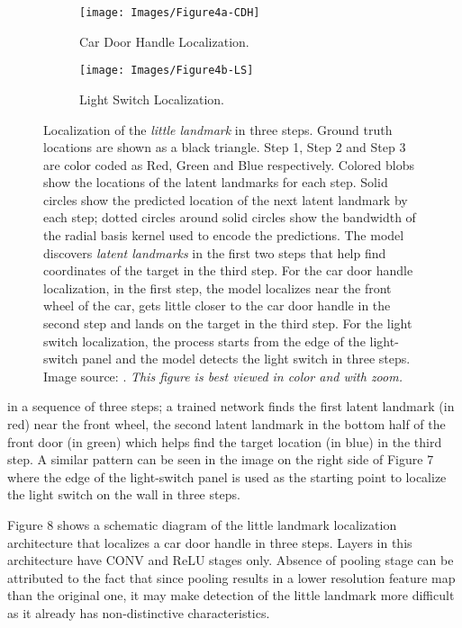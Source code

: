 \documentclass [11pt,letterpaper ,openany ]{report}
\begin{document}
    \begin{figure}[h!]
    \centering
        \begin{subfigure}[b]{0.45\linewidth}
            \texttt{[image: Images/Figure4a-CDH]}
            \caption{Car Door Handle Localization.}
        \end{subfigure}
        \begin{subfigure}[b]{0.45\linewidth}
            \texttt{[image: Images/Figure4b-LS]}
            \caption{Light Switch Localization.}
        \end{subfigure}
        \caption{Localization of the \textit{little landmark} in three steps. Ground truth locations are shown as a black triangle. Step 1, Step 2 and Step 3 are color coded as Red, Green and Blue respectively. Colored blobs show the locations of the latent landmarks for each step. Solid circles show the predicted location of the next latent landmark by each step; dotted circles around solid circles show the bandwidth of the radial basis kernel used to encode the predictions. The model discovers \textit{latent landmarks} in the first two steps that help find coordinates of the target in the third step. For the car door handle localization, in the first step, the model localizes near the front wheel of the car, gets little closer to the car door handle in the second step and lands on the target in the third step. For the light switch localization, the process starts from the edge of the light-switch panel and the model detects the light switch in three steps. Image source: \cite{Singh_2016_CVPR}. \textit{This figure is best viewed in color and with zoom.}}
        \label{fig:localization}
    \end{figure}

    \noindent
     in a sequence of three steps; a trained network finds the first latent landmark (in red) near the front wheel, the second latent landmark in the bottom half of the front door (in green) which helps find the target location (in blue) in the third step. A similar pattern can be seen in the image on the right side of Figure 7 where the edge of the light-switch panel is used as the starting point to localize the light switch on the wall in three steps.

    Figure 8 shows a schematic diagram of the little landmark localization architecture that localizes a car door handle in three steps. Layers in this architecture have CONV and ReLU stages only. Absence of pooling stage can be attributed to the fact that since pooling results in a lower resolution feature map than the original one, it may make detection of the little landmark more difficult as it already has non-distinctive characteristics. 
\end{document}
